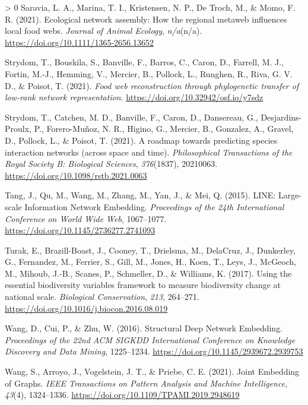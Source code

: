 \documentclass[11pt]{article}
\newlength{\cslhangindent}
\newenvironment{CSLReferences}[3] %
 {%
  \setlength{\parindent}{0pt}
  \ifodd #1 \everypar{\setlength{\hangindent}{\cslhangindent}}\ignorespaces\fi
  \ifnum #2 > 0
  \setlength{\parskip}{#2\baselineskip}
  \fi
 }%
 {}
\begin{document}
\begin{CSLReferences}{1}{0}
\leavevmode\hypertarget{ref-Saravia2021EcoNet}{}%
Saravia, L. A., Marina, T. I., Kristensen, N. P., De Troch, M., \& Momo,
F. R. (2021). Ecological network assembly: How the regional metaweb
influences local food webs. \emph{Journal of Animal Ecology},
\emph{n/a}(n/a). \url{https://doi.org/10.1111/1365-2656.13652}

\leavevmode\hypertarget{ref-Strydom2021FooWeb}{}%
Strydom, T., Bouskila, S., Banville, F., Barros, C., Caron, D., Farrell,
M. J., Fortin, M.-J., Hemming, V., Mercier, B., Pollock, L., Runghen,
R., Riva, G. V. D., \& Poisot, T. (2021). \emph{Food web reconstruction
through phylogenetic transfer of low-rank network representation}.
\url{https://doi.org/10.32942/osf.io/y7sdz}

\leavevmode\hypertarget{ref-Strydom2021RoaPre}{}%
Strydom, T., Catchen, M. D., Banville, F., Caron, D., Dansereau, G.,
Desjardins-Proulx, P., Forero-Muñoz, N. R., Higino, G., Mercier, B.,
Gonzalez, A., Gravel, D., Pollock, L., \& Poisot, T. (2021). A roadmap
towards predicting species interaction networks (across space and time).
\emph{Philosophical Transactions of the Royal Society B: Biological
Sciences}, \emph{376}(1837), 20210063.
\url{https://doi.org/10.1098/rstb.2021.0063}

\leavevmode\hypertarget{ref-Tang2015LinLar}{}%
Tang, J., Qu, M., Wang, M., Zhang, M., Yan, J., \& Mei, Q. (2015). LINE:
Large-scale Information Network Embedding. \emph{Proceedings of the 24th
International Conference on World Wide Web}, 1067--1077.
\url{https://doi.org/10.1145/2736277.2741093}

\leavevmode\hypertarget{ref-Turak2017UsiEss}{}%
Turak, E., Brazill-Boast, J., Cooney, T., Drielsma, M., DelaCruz, J.,
Dunkerley, G., Fernandez, M., Ferrier, S., Gill, M., Jones, H., Koen,
T., Leys, J., McGeoch, M., Mihoub, J.-B., Scanes, P., Schmeller, D., \&
Williams, K. (2017). Using the essential biodiversity variables
framework to measure biodiversity change at national scale.
\emph{Biological Conservation}, \emph{213}, 264--271.
\url{https://doi.org/10.1016/j.biocon.2016.08.019}

\leavevmode\hypertarget{ref-Wang2016StrDee}{}%
Wang, D., Cui, P., \& Zhu, W. (2016). Structural Deep Network Embedding.
\emph{Proceedings of the 22nd ACM SIGKDD International Conference on
Knowledge Discovery and Data Mining}, 1225--1234.
\url{https://doi.org/10.1145/2939672.2939753}

\leavevmode\hypertarget{ref-Wang2021JoiEmb}{}%
Wang, S., Arroyo, J., Vogelstein, J. T., \& Priebe, C. E. (2021). Joint
Embedding of Graphs. \emph{IEEE Transactions on Pattern Analysis and
Machine Intelligence}, \emph{43}(4), 1324--1336.
\url{https://doi.org/10.1109/TPAMI.2019.2948619}


\end{CSLReferences}
\end{document}
